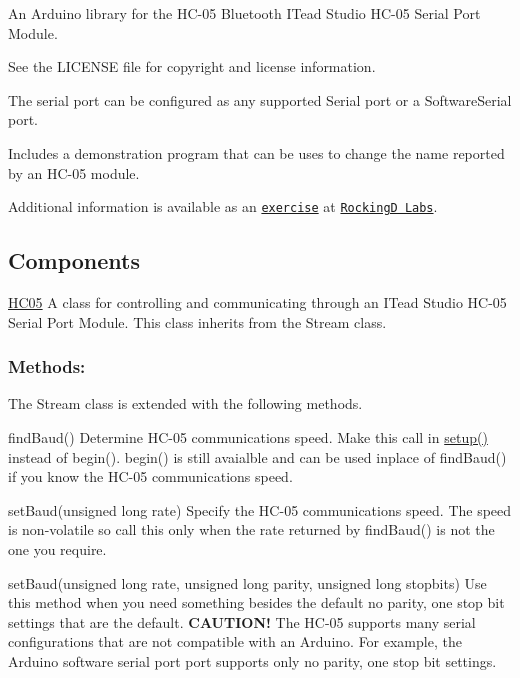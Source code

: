 An Arduino library for the H\+C-\/05 Bluetooth I\+Tead Studio H\+C-\/05 Serial Port Module.

See the {\ttfamily L\+I\+C\+E\+N\+SE} file for copyright and license information.

The serial port can be configured as any supported Serial port or a Software\+Serial port.

Includes a demonstration program that can be uses to change the name reported by an H\+C-\/05 module.

Additional information is available as an \href{http://rockingdlabs.dunmire.org/exercises-experiments/hc05-bluetooth}{\tt exercise} at \href{http://rockingdlabs.dunmire.org}{\tt RockingD Labs}.

\subsection*{Components }

{\ttfamily \hyperlink{class_h_c05}{H\+C05}} A class for controlling and communicating through an I\+Tead Studio H\+C-\/05 Serial Port Module. This class inherits from the Stream class.

\subsubsection*{Methods\+:}

The Stream class is extended with the following methods.

{\ttfamily find\+Baud()} Determine H\+C-\/05 communications speed. Make this call in \hyperlink{echo__server_8cpp_a4fc01d736fe50cf5b977f755b675f11d}{setup()} instead of {\ttfamily begin()}. {\ttfamily begin()} is still avaialble and can be used inplace of {\ttfamily find\+Baud()} if you know the H\+C-\/05 communications speed.

{\ttfamily set\+Baud(unsigned long rate)} Specify the H\+C-\/05 communications speed. The speed is non-\/volatile so call this only when the rate returned by find\+Baud() is not the one you require.

{\ttfamily set\+Baud(unsigned long rate, unsigned long parity, unsigned long stopbits)} Use this method when you need something besides the default no parity, one stop bit settings that are the default. {\bfseries C\+A\+U\+T\+I\+O\+N!} The H\+C-\/05 supports many serial configurations that are not compatible with an Arduino. For example, the Arduino software serial port port supports only no parity, one stop bit settings.

